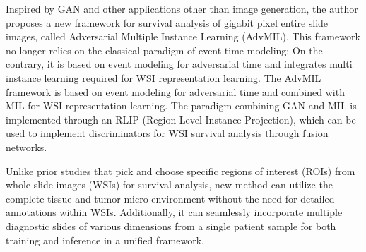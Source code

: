 \documentclass[journal,twoside,web]{ieeecolor}
\begin{document}

Inspired by GAN\cite{goodfellow2014generative} and other applications other than image generation\cite{}, the author proposes a new framework for survival analysis of gigabit pixel entire slide images, called Adversarial Multiple Instance Learning (AdvMIL). This framework no longer relies on the classical paradigm of event time modeling; On the contrary, it is based on event modeling for adversarial time and integrates multi instance learning required for WSI representation learning. The AdvMIL framework is based on event modeling for adversarial time and combined with MIL for WSI representation learning. The paradigm combining GAN and MIL is implemented through an RLIP (Region Level Instance Projection), which can be used to implement discriminators for WSI survival analysis through fusion networks.

Unlike prior studies that pick and choose specific regions of interest (ROIs) from whole-slide images (WSIs) for survival analysis, new method can utilize the complete tissue and tumor micro-environment without the need for detailed annotations within WSIs. 
Additionally, it can seamlessly incorporate multiple diagnostic slides of various dimensions from a single patient sample for both training and inference in a unified framework.
\end{document}
